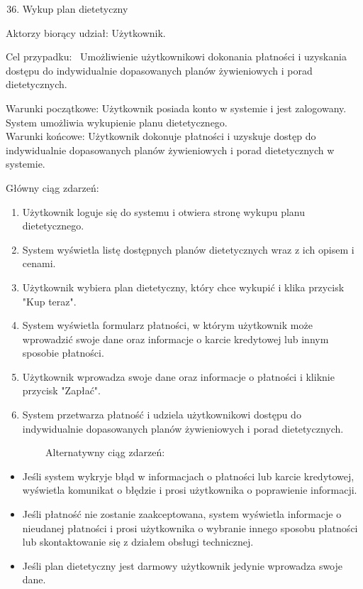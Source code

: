 \begin{enumerate}
\setcounter{enumi}{35}
\tightlist
\item
  {Wykup plan dietetyczny}
\end{enumerate}

{Aktorzy biorący udział: Użytkownik.}

{Cel przypadku: ~Umożliwienie użytkownikowi dokonania płatności i
uzyskania dostępu do indywidualnie dopasowanych planów żywieniowych i
porad dietetycznych.}

{Warunki początkowe: Użytkownik posiada konto w systemie i jest
zalogowany. System umożliwia wykupienie planu dietetycznego.\\
Warunki końcowe: Użytkownik dokonuje płatności i uzyskuje dostęp do
indywidualnie dopasowanych planów żywieniowych i porad dietetycznych w
systemie.}

{Główny ciąg zdarzeń:}

\begin{enumerate}
\tightlist
\item
  {Użytkownik loguje się do systemu i otwiera stronę wykupu planu
  dietetycznego.}
\item
  {System wyświetla listę dostępnych planów dietetycznych wraz z ich
  opisem i cenami.}
\item
  {Użytkownik wybiera plan dietetyczny, który chce wykupić i klika
  przycisk "Kup teraz".}
\item
  {System wyświetla formularz płatności, w którym użytkownik może
  wprowadzić swoje dane oraz informacje o karcie kredytowej lub innym
  sposobie płatności.}
\item
  {Użytkownik wprowadza swoje dane oraz informacje o płatności i kliknie
  przycisk "Zapłać".}
\item
  {System przetwarza płatność i udziela użytkownikowi dostępu do
  indywidualnie dopasowanych planów żywieniowych i porad dietetycznych.}
\end{enumerate}

{~~~~~~~~Alternatywny ciąg zdarzeń:}

\begin{itemize}
\tightlist
\item
  {Jeśli system wykryje błąd w informacjach o płatności lub karcie
  kredytowej, wyświetla komunikat o błędzie i prosi użytkownika o
  poprawienie informacji.}
\item
  {Jeśli płatność nie zostanie zaakceptowana, system wyświetla
  informacje o nieudanej płatności i prosi użytkownika o wybranie innego
  sposobu płatności lub skontaktowanie się z działem obsługi
  technicznej.}
\item
  {Jeśli plan dietetyczny jest darmowy użytkownik jedynie wprowadza
  swoje dane.}
\end{itemize}

